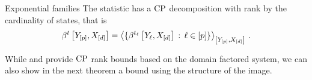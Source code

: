 \begin{example}{Exponential families}
    \label{exa:expFamCP}
    The statistic has a $\mathrm{CP}$ decomposition with rank by the cardinality of states, that is
    \begin{align*}
        \bencodingofat{\sstat}{\headvariables,\shortcatvariables}
        = \contractionof{
            \{ \bencodingofat{\sstatcoordinateof{\selindex}}{\headvariableof{\selindex},\shortcatvariables} \wcols \selindexin \}
        }{\headvariables,\shortcatvariables} \, .
    \end{align*}
\end{example}

While  and  provide $\mathrm{CP}$ rank bounds based on the domain factored system, we can also show in the next theorem a bound using the structure of the image.

